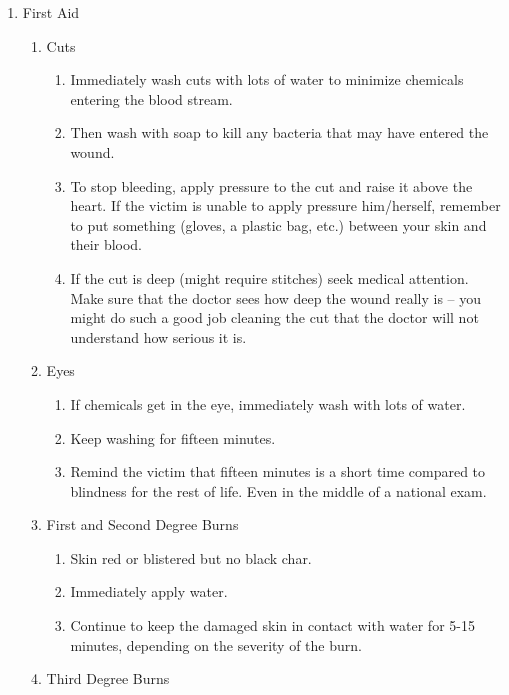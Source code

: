 \begin{enumerate}
\item{First Aid}
\begin{enumerate}

\item{Cuts}

\begin{enumerate}
\item{Immediately wash cuts with lots of water 
to minimize chemicals entering the blood stream.}
\item{Then wash with soap to kill any bacteria that may have entered the wound.}
\item{To stop bleeding, apply pressure to the cut and raise it above the heart. 
If the victim is unable to apply pressure him/herself, 
remember to put something (gloves, a plastic bag, etc.) 
between your skin and their blood.}
\item{If the cut is deep (might require stitches) seek medical attention. 
Make sure that the doctor sees how deep the wound really is -- 
you might do such a good job cleaning the cut 
that the doctor will not understand how serious it is.}
\end{enumerate}

\item{Eyes}

\begin{enumerate}
\item{If chemicals get in the eye, immediately wash with lots of water.}
\item{Keep washing for fifteen minutes.}
\item{Remind the victim that fifteen minutes is a short time 
compared to blindness for the rest of life. 
Even in the middle of a national exam.}
\end{enumerate}

\item{First and Second Degree Burns}

\begin{enumerate}
\item{Skin red or blistered but no black char.}
\item{Immediately apply water.}
\item{Continue to keep the damaged skin in contact with water for 5-15 minutes, 
depending on the severity of the burn.}
\end{enumerate}

\item{Third Degree Burns}


\end{enumerate}
\end{enumerate}
